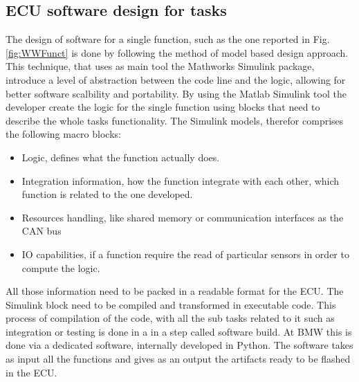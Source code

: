 \documentclass[../main.tex]{subfiles}
\begin{document}
\subsection{ECU software design for tasks}
The design of software for a single function, such as the one reported in Fig.\ref{fig:WWFunct} is done by following the method of model based design approach. This technique, that uses as main tool the Mathworks Simulink package, introduce a level of abstraction between the code line and the logic, allowing for better software scalbility and portability. By using the Matlab Simulink tool the developer create the logic for the single function using blocks that need to describe the whole tasks functionality. The Simulink models, therefor comprises the following macro blocks:
\begin{itemize}
    \item Logic, defines what the function actually does. 
    \item Integration information, how the function integrate with each other, which function is related to the one developed. 
    \item Resources handling, like shared memory or communication interfaces as  the CAN bus
    \item IO capabilities, if a function require the read of particular sensors in order to compute the logic. 
\end{itemize}
All those information need to be packed in a readable format for the ECU. The Simulink block need to be compiled and transformed in executable code. This process of compilation of the code, with all the sub tasks related to it such as integration or testing is done in a in a step called software build. 
At BMW this is done via a dedicated software, internally developed in Python. The software takes as input all the functions and gives as an output the artifacts ready to be flashed in the ECU.
\end{document}

